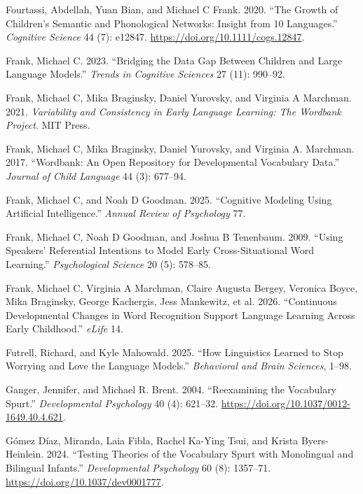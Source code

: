 \documentclass[
  11pt,
]{article}
\newlength{\cslhangindent}
\newenvironment{CSLReferences}[2] %
 {\begin{list}{}{%
  \setlength{\itemindent}{0pt}
  \setlength{\leftmargin}{0pt}
  \setlength{\parsep}{0pt}
  \ifodd #1
   \setlength{\leftmargin}{\cslhangindent}
   \setlength{\itemindent}{-1\cslhangindent}
  \fi
  \setlength{\itemsep}{#2\baselineskip}}}
 {\end{list}}
\begin{document}
\begin{CSLReferences}{1}{0}
Fourtassi, Abdellah, Yuan Bian, and Michael C Frank. 2020. {``The Growth
of Children's Semantic and Phonological Networks: Insight from 10
Languages.''} \emph{Cognitive Science} 44 (7): e12847.
\url{https://doi.org/10.1111/cogs.12847}.

Frank, Michael C. 2023. {``Bridging the Data Gap Between Children and
Large Language Models.''} \emph{Trends in Cognitive Sciences} 27 (11):
990--92.

Frank, Michael C, Mika Braginsky, Daniel Yurovsky, and Virginia A
Marchman. 2021. \emph{Variability and Consistency in Early Language
Learning: The Wordbank Project}. MIT Press.

Frank, Michael C, Mika Braginsky, Daniel Yurovsky, and Virginia A.
Marchman. 2017. {``Wordbank: An Open Repository for Developmental
Vocabulary Data.''} \emph{Journal of Child Language} 44 (3): 677--94.

Frank, Michael C, and Noah D Goodman. 2025. {``Cognitive Modeling Using
Artificial Intelligence.''} \emph{Annual Review of Psychology} 77.

Frank, Michael C, Noah D Goodman, and Joshua B Tenenbaum. 2009. {``Using
Speakers' Referential Intentions to Model Early Cross-Situational Word
Learning.''} \emph{Psychological Science} 20 (5): 578--85.

Frank, Michael C, Virginia A Marchman, Claire Augusta Bergey, Veronica
Boyce, Mika Braginsky, George Kachergis, Jess Mankewitz, et al. 2026.
{``Continuous Developmental Changes in Word Recognition Support Language
Learning Across Early Childhood.''} \emph{eLife} 14.

Futrell, Richard, and Kyle Mahowald. 2025. {``How Linguistics Learned to
Stop Worrying and Love the Language Models.''} \emph{Behavioral and
Brain Sciences}, 1--98.

Ganger, Jennifer, and Michael R. Brent. 2004. {``Reexamining the
Vocabulary Spurt.''} \emph{Developmental Psychology} 40 (4): 621--32.
\url{https://doi.org/10.1037/0012-1649.40.4.621}.

Gómez Díaz, Miranda, Laia Fibla, Rachel Ka-Ying Tsui, and Krista
Byers-Heinlein. 2024. {``Testing Theories of the Vocabulary Spurt with
Monolingual and Bilingual Infants.''} \emph{Developmental Psychology} 60
(8): 1357--71. \url{https://doi.org/10.1037/dev0001777}.


\end{CSLReferences}
\end{document}
